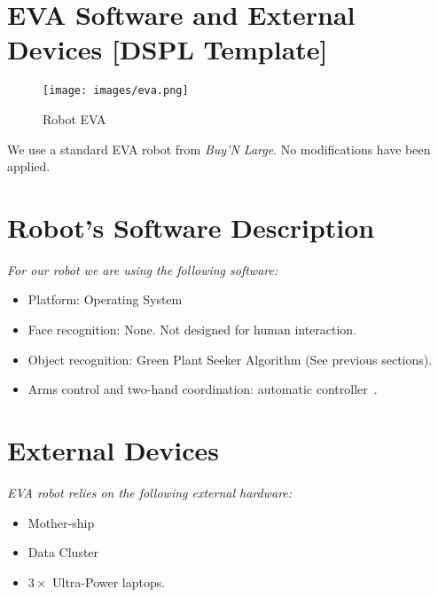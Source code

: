 
\section*{EVA Software and External Devices [DSPL Template]}%
\label{sec:annex-DSPL}

\setlength\intextsep{0pt}
\begin{wrapfigure}[10]{r}{0.3\textwidth}
	\centering
	\texttt{[image: images/eva.png]}
	\caption{Robot EVA}%
	\label{fig:eva}
\end{wrapfigure}

We use a standard EVA robot from \textit{Buy'N Large}. No modifications have been applied.

\section*{Robot's Software Description}

\textit{For our robot we are using the following software:}

\begin{itemize}
	\item Platform: \BnL{} Operating System
	\item Face recognition: None. Not designed for human interaction.
	\item Object recognition: \BnL{} Green Plant Seeker Algorithm (See previous sections).
	\item Arms control and two-hand coordination: \BnL{} automatic controller~\cite{bnl2}.
\end{itemize}

\section*{External Devices}

\textit{EVA robot relies on the following external hardware:}

\begin{itemize}
	\item \BnL{} Mother-ship
	\item \BnL{} Data Cluster
	\item $3 \times$ \BnL{} Ultra-Power laptops.
\end{itemize}

